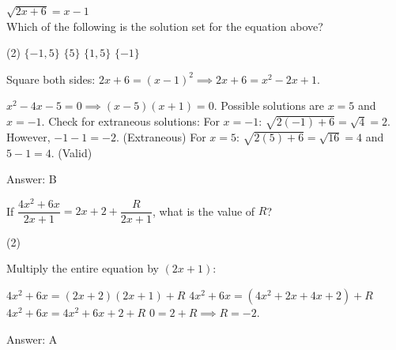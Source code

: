 \documentclass[11pt,paper=a4,answers]{exam}
\begin{document}
\begin{questions}
\vspace{1cm}

\question
$\sqrt{2x + 6} = x - 1$ \\
Which of the following is the solution set for the equation above?
\begin{tasks}(2)
    \task $\{-1, 5\}$ \task $\{5\}$ \task $\{1, 5\}$ \task $\{ -1\}$
\end{tasks}

\begin{solution}
Square both sides: $2x + 6 = (x - 1)^2 \implies 2x + 6 = x^2 - 2x + 1$.
\vspace{5pt}
\begin{center}
$x^2 - 4x - 5 = 0 \implies (x - 5)(x + 1) = 0$.
\vspace{5pt}
Possible solutions are $x = 5$ and $x = -1$.
\vspace{5pt}
Check for extraneous solutions:
\vspace{5pt}
For $x = -1$: $\sqrt{2(-1)+6} = \sqrt{4} = 2$. However, $-1 - 1 = -2$. (Extraneous)
\vspace{5pt}
For $x = 5$: $\sqrt{2(5)+6} = \sqrt{16} = 4$ and $5 - 1 = 4$. (Valid)
\end{center}
\vspace{5pt}
Answer: \colorbox{yellow!100}{B}
\end{solution}

\vspace{1cm}

\question
If $\dfrac{4x^2 + 6x}{2x + 1} = 2x + 2 + \dfrac{R}{2x + 1}$, what is the value of $R$?
\begin{tasks}(2)
       
\end{tasks}

\begin{solution}
Multiply the entire equation by $(2x + 1)$:
\vspace{5pt}
\begin{center}
$4x^2 + 6x = (2x + 2)(2x + 1) + R$
\vspace{5pt}
$4x^2 + 6x = (4x^2 + 2x + 4x + 2) + R$
\vspace{5pt}
$4x^2 + 6x = 4x^2 + 6x + 2 + R$
\vspace{5pt}
$0 = 2 + R \implies R = -2$.
\end{center}
\vspace{5pt}
Answer: \colorbox{yellow!100}{A}
\end{solution}


\end{questions}
\end{document}
